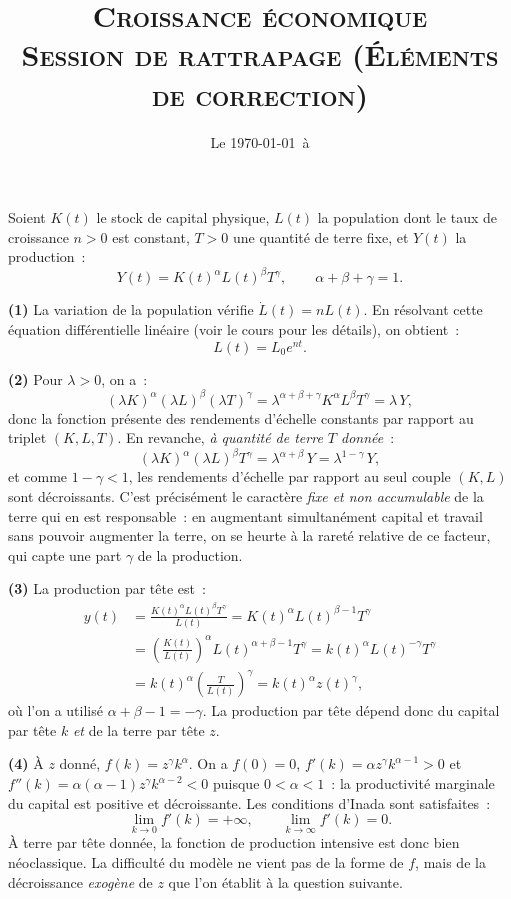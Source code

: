 \documentclass[11pt,a4paper,notitlepage]{article}
\begin{document}
\title{\textsc{Croissance économique\\ \small{Session de rattrapage (Éléments de correction)}}}
\date{Le \today\ à \thistime}

\maketitle
\thispagestyle{empty}

Soient $K(t)$ le stock de capital physique, $L(t)$ la population dont
le taux de croissance $n>0$ est constant, $T>0$ une quantité de terre
fixe, et $Y(t)$ la production~:
\[
Y(t) = K(t)^{\alpha}L(t)^{\beta}T^{\gamma},\qquad \alpha+\beta+\gamma=1.
\]

\textbf{(1)} La variation de la population vérifie $\dot L(t)=nL(t)$.
En résolvant cette équation différentielle linéaire (voir le cours
pour les détails), on obtient~:
\[
L(t) = L_0 e^{nt}.
\]

\textbf{(2)} Pour $\lambda>0$, on a~:
\[
(\lambda K)^{\alpha}(\lambda L)^{\beta}(\lambda T)^{\gamma}
= \lambda^{\alpha+\beta+\gamma}K^{\alpha}L^{\beta}T^{\gamma}
= \lambda\, Y,
\]
donc la fonction présente des rendements d'échelle constants par
rapport au triplet $(K,L,T)$. En revanche, \emph{à quantité de terre
$T$ donnée}~:
\[
(\lambda K)^{\alpha}(\lambda L)^{\beta}T^{\gamma}
= \lambda^{\alpha+\beta}\,Y = \lambda^{1-\gamma}\,Y,
\]
et comme $1-\gamma<1$, les rendements d'échelle par rapport au seul
couple $(K,L)$ sont décroissants. C'est précisément le caractère
\emph{fixe et non accumulable} de la terre qui en est responsable~:
en augmentant simultanément capital et travail sans pouvoir augmenter
la terre, on se heurte à la rareté relative de ce facteur, qui capte
une part $\gamma$ de la production.

\textbf{(3)} La production par tête est~:
\[
\begin{split}
y(t) &= \frac{K(t)^{\alpha}L(t)^{\beta}T^{\gamma}}{L(t)}
       = K(t)^{\alpha}L(t)^{\beta-1}T^{\gamma}\\
     &= \left(\frac{K(t)}{L(t)}\right)^{\alpha}L(t)^{\alpha+\beta-1}T^{\gamma}
       = k(t)^{\alpha}L(t)^{-\gamma}T^{\gamma}\\
     &= k(t)^{\alpha}\left(\frac{T}{L(t)}\right)^{\gamma}
       = k(t)^{\alpha}z(t)^{\gamma},
\end{split}
\]
où l'on a utilisé $\alpha+\beta-1=-\gamma$. La production par tête
dépend donc du capital par tête $k$ \emph{et} de la terre par tête
$z$.

\textbf{(4)} À $z$ donné, $f(k)=z^{\gamma}k^{\alpha}$. On a
$f(0)=0$, $f'(k)=\alpha z^{\gamma}k^{\alpha-1}>0$ et
$f''(k)=\alpha(\alpha-1)z^{\gamma}k^{\alpha-2}<0$ puisque
$0<\alpha<1$~: la productivité marginale du capital est positive et
décroissante. Les conditions d'Inada sont satisfaites~:
\[
\lim_{k\rightarrow 0}f'(k)=+\infty,
\qquad
\lim_{k\rightarrow\infty}f'(k)=0.
\]
À terre par tête donnée, la fonction de production intensive est donc
bien néoclassique. La difficulté du modèle ne vient pas de la forme de
$f$, mais de la décroissance \emph{exogène} de $z$ que l'on établit à
la question suivante.
\end{document}
